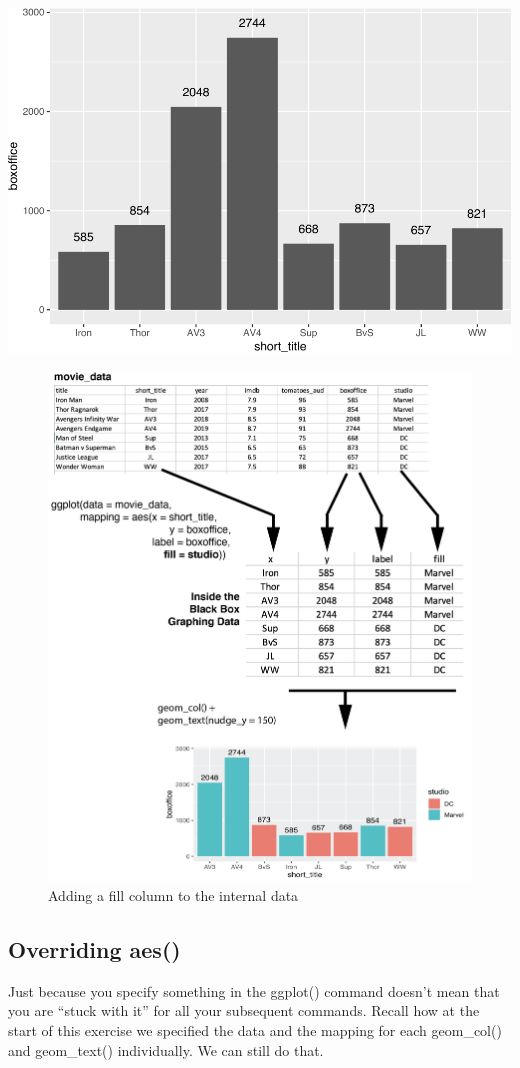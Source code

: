 \documentclass[
]{krantz}
\begin{document}
\includegraphics{bookdown_files/figure-latex/unnamed-chunk-243-1.pdf}

\begin{figure}
\includegraphics[width=0.7\linewidth]{ch_graphing/images/mapping_fill} \caption{Adding a fill column to the internal data}\label{fig:addfill}
\end{figure}

\hypertarget{overriding-aes}{%
\subsection{Overriding aes()}\label{overriding-aes}}

Just because you specify something in the ggplot() command doesn't mean that you are ``stuck with it'' for all your subsequent commands. Recall how at the start of this exercise we specified the data and the mapping for each geom\_col() and geom\_text() individually. We can still do that.
\end{document}
